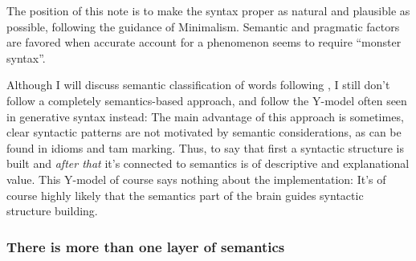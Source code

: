 \documentclass[UTF8, a4paper, oneside, scheme=plain]{ctexrep}
\begin{document}
The position of this note is to make the syntax proper as natural and plausible as possible,
following the guidance of Minimalism.
Semantic and pragmatic factors are favored 
when accurate account for a phenomenon seems to 
require ``monster syntax''.

Although I will discuss semantic classification of words following \citet{dixon2005semantic},
I still don't follow a completely semantics-based approach,
and follow the Y-model often seen in generative syntax instead:
The main advantage of this approach 
is sometimes, clear syntactic patterns are not motivated by semantic considerations,
as can be found in idioms and \acs{tam} marking.
Thus, to say that first a syntactic structure is built 
and \emph{after that} it's connected to semantics 
is of descriptive and explanational value.
This Y-model of course says nothing about the implementation:
It's of course highly likely that the semantics part of the brain 
guides syntactic structure building.

\subsubsection{There is more than one layer of semantics}\label{sec:more-than-one-layer}
\end{document}
